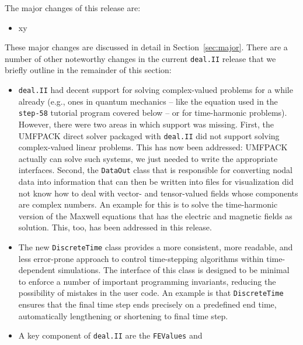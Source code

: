 \documentclass{ansarticle-preprint}
\newcommand{\specialword}[1]{\texttt{#1}}
\newcommand{\dealii}{{\specialword{deal.II}}\xspace}
\begin{document}
The major changes of this release are:
%
\begin{itemize}
  \item xy 
\end{itemize}
%
These major changes are discussed in detail in Section~\ref{sec:major}. There
are a number of other noteworthy changes in the current \dealii{} release
that we briefly outline in the remainder of this section:
%
\begin{itemize}
  \item \dealii{} had decent support for solving complex-valued problems
        for a while already
        (e.g., ones in quantum mechanics -- like the equation used in the
        \texttt{step-58} tutorial program covered below -- or for
        time-harmonic problems). However, there were two
        areas in which support was missing. First, the UMFPACK direct solver
        packaged with \dealii{} did not support solving complex-valued
        linear problems. This has now been addressed: UMFPACK actually can
        solve such systems, we just needed to write the appropriate
        interfaces. Second, the \texttt{DataOut} class that is responsible
        for converting nodal data into information that can then be written
        into files for visualization did not know how to deal with vector-
        and tensor-valued fields whose components are complex numbers. An
        example for this is to solve the time-harmonic version of the
        Maxwell equations that has the electric and magnetic fields as
        solution. This, too, has been addressed in this release.
  \item The new \texttt{DiscreteTime} class provides a more
        consistent, more readable, and less error-prone approach to control
        time-stepping algorithms within time-dependent simulations.
        The interface of this class is designed to be minimal
        to enforce a number of important programming invariants, reducing
        the possibility of mistakes in the user code.
        An example is that \texttt{DiscreteTime} ensures that the final time step ends
        precisely on a predefined end time, automatically
        lengthening or shortening to final time step.
  \item A key component of \dealii{} are the \texttt{FEValues} and

\end{itemize}
\end{document}
